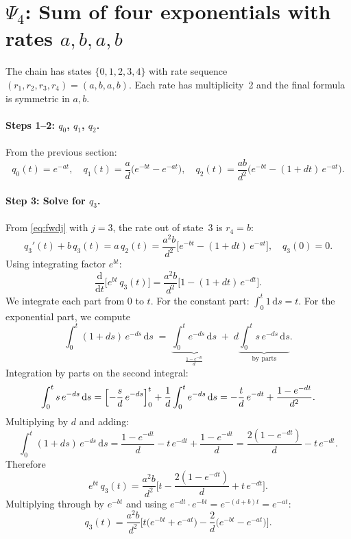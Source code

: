 \documentclass[11pt,a4paper]{article}
\newcommand{\dd}{\mathrm{d}}
\begin{document}
\section{$\Psi_4$: Sum of four exponentials with rates $a, b, a, b$}

The chain has states $\{0, 1, 2, 3, 4\}$ with rate sequence
$(r_1, r_2, r_3, r_4) = (a, b, a, b)$.
Each rate has multiplicity~2 and the final formula is symmetric in $a, b$.

\paragraph{Steps 1--2: $q_0$, $q_1$, $q_2$.}
From the previous section:
\[
  q_0(t) = e^{-at}, \quad
  q_1(t) = \frac{a}{d}\bigl(e^{-bt} - e^{-at}\bigr), \quad
  q_2(t) = \frac{ab}{d^2}\bigl(e^{-bt} - (1 + dt)\,e^{-at}\bigr).
\]

\paragraph{Step 3: Solve for $q_3$.}
From \eqref{eq:fwdj} with $j = 3$, the rate out of state~3 is $r_4 = b$:
\[
  q_3'(t) + b\, q_3(t) = a\, q_2(t)
  = \frac{a^2 b}{d^2}\bigl[e^{-bt} - (1 + dt)\,e^{-at}\bigr],
  \quad q_3(0) = 0.
\]
Using integrating factor $e^{bt}$:
\[
  \frac{\dd}{\dd t}\bigl[e^{bt}\, q_3(t)\bigr]
  = \frac{a^2 b}{d^2}\bigl[1 - (1 + dt)\,e^{-dt}\bigr].
\]
We integrate each part from $0$ to $t$.
For the constant part: $\int_0^t 1\,\dd s = t$.
For the exponential part, we compute
\[
  \int_0^t (1 + ds)\,e^{-ds}\,\dd s
  \;=\; \underbrace{\int_0^t e^{-ds}\,\dd s}_{\displaystyle \frac{1 - e^{-dt}}{d}}
  \;+\; d \underbrace{\int_0^t s\, e^{-ds}\,\dd s}_{\text{by parts}}.
\]
Integration by parts on the second integral:
\[
  \int_0^t s\, e^{-ds}\,\dd s
  = \Bigl[-\frac{s}{d}\,e^{-ds}\Bigr]_0^t + \frac{1}{d}\int_0^t e^{-ds}\,\dd s
  = -\frac{t}{d}\,e^{-dt} + \frac{1 - e^{-dt}}{d^2}.
\]
Multiplying by $d$ and adding:
\[
  \int_0^t (1 + ds)\,e^{-ds}\,\dd s
  = \frac{1 - e^{-dt}}{d}
    - t\,e^{-dt} + \frac{1 - e^{-dt}}{d}
  = \frac{2(1 - e^{-dt})}{d} - t\,e^{-dt}.
\]
Therefore
\[
  e^{bt}\, q_3(t)
  = \frac{a^2 b}{d^2}\biggl[t - \frac{2(1 - e^{-dt})}{d} + t\,e^{-dt}\biggr].
\]
Multiplying through by $e^{-bt}$ and using $e^{-dt} \cdot e^{-bt} = e^{-(d+b)t} = e^{-at}$:
\[
  q_3(t) = \frac{a^2 b}{d^2}\biggl[
    t\bigl(e^{-bt} + e^{-at}\bigr) - \frac{2}{d}\bigl(e^{-bt} - e^{-at}\bigr)
  \biggr].
\]
\end{document}
